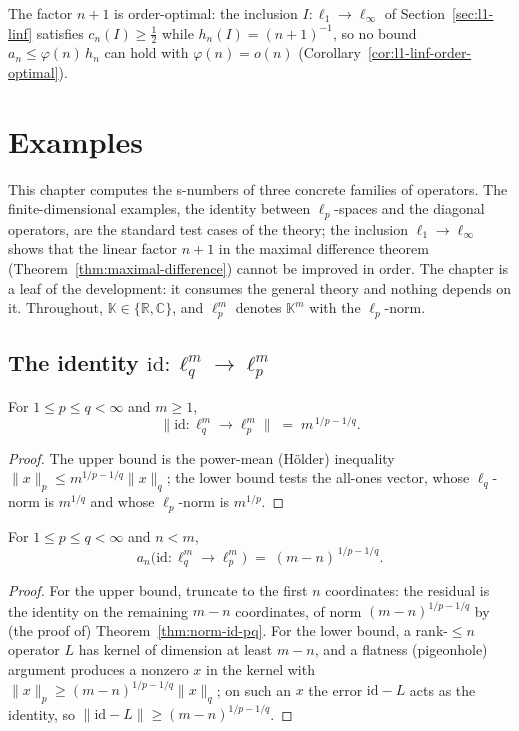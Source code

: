 The factor $n+1$ is order-optimal: the inclusion $I \colon \ell_1 \to
\ell_\infty$ of Section~\ref{sec:l1-linf} satisfies $c_n(I) \ge \tfrac12$ while
$h_n(I) = (n+1)^{-1}$, so no bound $a_n \le \varphi(n)\, h_n$ can hold with
$\varphi(n) = o(n)$ (Corollary~\ref{cor:l1-linf-order-optimal}).

\chapter{Examples}
\label{ch:op-examples}

This chapter computes the s-numbers of three concrete families of
operators. The finite-dimensional examples, the identity between
$\ell_p$-spaces and the diagonal operators, are the standard test cases
of the theory; the inclusion $\ell_1 \to \ell_\infty$ shows that the linear
factor $n+1$ in the maximal difference theorem
(Theorem~\ref{thm:maximal-difference}) cannot be improved in order. The
chapter is a leaf of the development: it consumes the general theory and
nothing depends on it. Throughout, $\mathbb{K} \in \{\mathbb{R},
\mathbb{C}\}$, and $\ell_p^m$ denotes $\mathbb{K}^m$ with the
$\ell_p$-norm.

\section{The identity \texorpdfstring{$\mathrm{id} : \ell_q^m \to \ell_p^m$}{id : lq to lp}}
\label{sec:ex-identity}

\begin{theorem}
\label{thm:norm-id-pq}
\leanok
For $1 \le p \le q < \infty$ and $m \ge 1$,
\[
  \bigl\| \mathrm{id} : \ell_q^m \to \ell_p^m \bigr\|
  \;=\; m^{\,1/p - 1/q}.
\]
\end{theorem}
\begin{proof}
\leanok
The upper bound is the power-mean (H\"older) inequality
$\|x\|_p \le m^{1/p-1/q} \|x\|_q$; the lower bound tests the all-ones
vector, whose $\ell_q$-norm is $m^{1/q}$ and whose $\ell_p$-norm is
$m^{1/p}$.
\end{proof}

\begin{theorem}
\label{thm:sn-id-pq}
\leanok
{}
For $1 \le p \le q < \infty$ and $n < m$,
\[
  a_n\bigl( \mathrm{id} : \ell_q^m \to \ell_p^m \bigr)
  \;=\; (m - n)^{\,1/p - 1/q}.
\]
\end{theorem}
\begin{proof}
\leanok
{}
For the upper bound, truncate to the first $n$ coordinates: the residual is
the identity on the remaining $m - n$ coordinates, of norm
$(m-n)^{1/p-1/q}$ by (the proof of) Theorem~\ref{thm:norm-id-pq}. For the
lower bound, a rank-$\le n$ operator $L$ has kernel of dimension at least
$m - n$, and a flatness (pigeonhole) argument produces a nonzero $x$ in
the kernel with $\|x\|_p \ge (m-n)^{1/p-1/q} \|x\|_q$; on such an $x$ the
error $\mathrm{id} - L$ acts as the identity, so
$\|\mathrm{id} - L\| \ge (m-n)^{1/p-1/q}$.
\end{proof}

